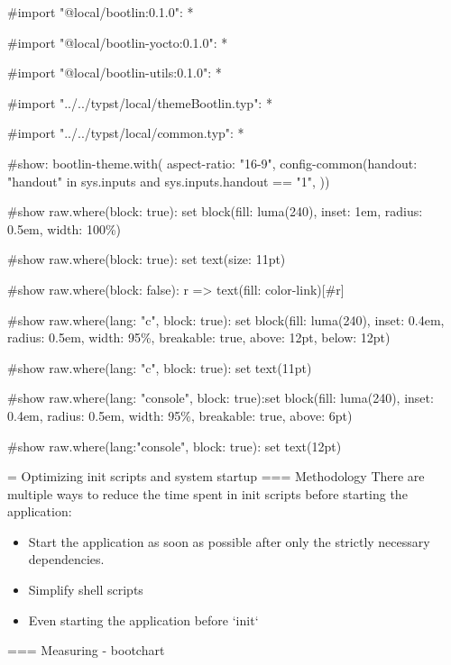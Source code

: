 #import "@local/bootlin:0.1.0": *

#import "@local/bootlin-yocto:0.1.0": *

#import "@local/bootlin-utils:0.1.0": *

#import "../../typst/local/themeBootlin.typ": *

#import "../../typst/local/common.typ": *

#show: bootlin-theme.with( aspect-ratio: "16-9", config-common(handout: "handout" in sys.inputs and sys.inputs.handout == "1", ))

#show raw.where(block: true): set block(fill: luma(240), inset: 1em, radius: 0.5em, width: 100\%)

#show raw.where(block: true): set text(size: 11pt)

#show raw.where(block: false): r => text(fill: color-link)[#r]

#show raw.where(lang: "c", block: true): set block(fill: luma(240), inset: 0.4em, radius: 0.5em, width: 95\%, breakable: true, above: 12pt, below: 12pt)

#show raw.where(lang: "c", block: true): set text(11pt)

#show raw.where(lang: "console", block: true):set block(fill: luma(240), inset: 0.4em, radius: 0.5em, width: 95\%, breakable: true, above: 6pt)

#show raw.where(lang:"console", block: true): set text(12pt)

 = Optimizing init scripts and system startup
=== Methodology There are multiple ways to reduce the time spent in init scripts before starting the application:
\begin{itemize}
	\item Start the application as soon as possible after only the
              strictly necessary dependencies.
	\item Simplify shell scripts
	\item Even starting the application before `init`
\end{itemize}


=== Measuring - bootchart

